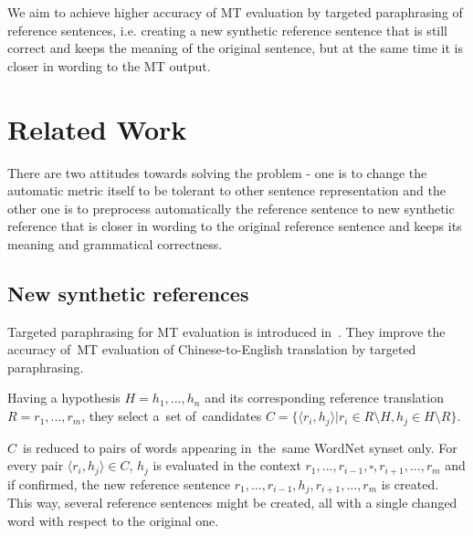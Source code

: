 \documentclass[11pt]{article}
\begin{document}
We aim to achieve higher accuracy of MT evaluation by targeted paraphrasing 
of reference sentences, i.e. creating a new synthetic reference sentence that 
is still correct and keeps the meaning of the original sentence, but at the 
same time it is closer in wording to the MT output. 


\section{Related Work}
There are two attitudes towards solving the problem - one is to change the automatic
metric itself to be tolerant to other sentence representation and the other one is to 
preprocess automatically the reference sentence to new synthetic reference that is closer 
in wording to the original reference sentence and keeps its meaning and grammatical correctness.

\subsection{New synthetic references}
Targeted paraphrasing for MT evaluation is introduced in~. They 
improve the accuracy of~MT evaluation of Chinese-to-English translation by targeted 
paraphrasing.

Having a hypothesis $ H = h_1,...,h_n $ and its corresponding reference translation 
$ R =r_1, ...,r_m $, they select a~set of~candidates 
$ C = \lbrace \langle r_i,h_j \rangle  \vert r_i \in R \setminus H, h_j \in H \setminus R \rbrace $. 
 
$ C $~is reduced to pairs of words appearing in~the~same WordNet synset only. For every pair 
$  \langle r_i,h_j \rangle \in C $, $ h_j $ is evaluated in the context $ r_1,...,r_{i-1},\square,r_{i+1},...,r_m $
and if confirmed, the new reference sentence $ r_1,...,r_{i-1},h_j,r_{i+1},...,r_m $ is created.
This way, several reference sentences might be created, all with a single changed word with respect
to the original one.

%
%
\end{document}
